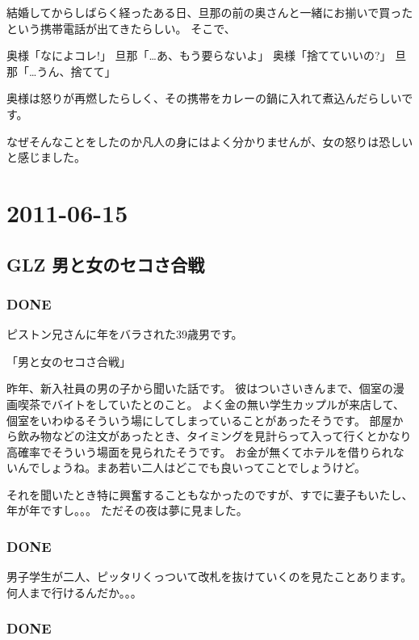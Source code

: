 \documentclass[11pt]{article}
\begin{document}
結婚してからしばらく経ったある日、旦那の前の奥さんと一緒にお揃いで買ったという携帯電話が出てきたらしい。
そこで、

 奥様「なによコレ!」
 旦那「\ldots{}あ、もう要らないよ」
 奥様「捨てていいの?」
 旦那「\ldots{}うん、捨てて」

奥様は怒りが再燃したらしく、その携帯をカレーの鍋に入れて煮込んだらしいです。

なぜそんなことをしたのか凡人の身にはよく分かりませんが、女の怒りは恐しいと感じました。
\subsubsection{}
\section{2011-06-15}
\label{sec-108}
\subsection{GLZ 男と女のセコさ合戦}
\label{sec-108_1}
\subsubsection{\textbf{DONE}}
\label{sec-108_1_1}

ピストン兄さんに年をバラされた39歳男です。

「男と女のセコさ合戦」

昨年、新入社員の男の子から聞いた話です。
彼はついさいきんまで、個室の漫画喫茶でバイトをしていたとのこと。
よく金の無い学生カップルが来店して、個室をいわゆるそういう場にしてしまっていることがあったそうです。
部屋から飲み物などの注文があったとき、タイミングを見計らって入って行くとかなり高確率でそういう場面を見られたそうです。
お金が無くてホテルを借りられないんでしょうね。まあ若い二人はどこでも良いってことでしょうけど。

それを聞いたとき特に興奮することもなかったのですが、すでに妻子もいたし、年が年ですし。。。
ただその夜は夢に見ました。
\subsubsection{\textbf{DONE}}
\label{sec-108_1_2}

男子学生が二人、ピッタリくっついて改札を抜けていくのを見たことあります。
何人まで行けるんだか。。。
\subsubsection{\textbf{DONE}}
\label{sec-108_1_3}
\end{document}
